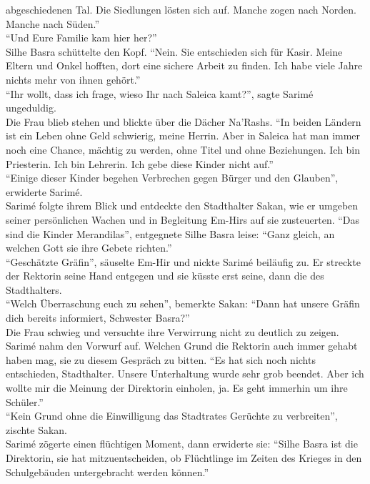 abgeschiedenen Tal. Die Siedlungen lösten sich auf. Manche zogen nach Norden. Manche nach 
Süden.''\\
``Und Eure Familie kam hier her?''\\
Silhe Basra schüttelte den Kopf. ``Nein. Sie entschieden sich für Kasir. Meine Eltern und Onkel 
hofften, dort eine sichere Arbeit zu finden. Ich habe viele Jahre nichts mehr von ihnen gehört.''\\
``Ihr wollt, dass ich frage, wieso Ihr nach Saleica kamt?'', sagte Sarimé ungeduldig.\\
Die Frau blieb stehen und blickte über die Dächer Na'Rashs. ``In beiden Ländern ist ein Leben ohne 
Geld schwierig, meine Herrin. Aber in Saleica hat man immer noch eine Chance, mächtig zu werden, 
ohne Titel und ohne Beziehungen. Ich bin Priesterin. Ich bin Lehrerin. Ich gebe diese Kinder nicht 
auf.''\\
``Einige dieser Kinder begehen Verbrechen gegen Bürger und den Glauben'', erwiderte Sarimé.\\
Sarimé folgte ihrem Blick und entdeckte den Stadthalter Sakan, wie er umgeben seiner persönlichen 
Wachen und in Begleitung Em-Hirs auf sie zusteuerten. ``Das sind die Kinder Merandilas'', 
entgegnete Silhe Basra leise: ``Ganz gleich, an welchen Gott sie ihre Gebete richten.''\\
``Geschätzte Gräfin'', säuselte Em-Hir und nickte Sarimé beiläufig zu. Er streckte der Rektorin 
seine Hand entgegen und sie küsste erst seine, dann die des Stadthalters.\\
``Welch Überraschung euch zu sehen'', bemerkte Sakan: ``Dann hat unsere Gräfin dich bereits 
informiert, Schwester Basra?''\\
Die Frau schwieg und versuchte ihre Verwirrung nicht zu deutlich zu zeigen.\\
Sarimé nahm den Vorwurf auf. Welchen Grund die Rektorin auch immer gehabt haben mag, sie zu diesem 
Gespräch zu bitten. ``Es hat sich noch nichts entschieden, Stadthalter. Unsere Unterhaltung wurde 
sehr grob beendet. Aber ich wollte mir die Meinung der Direktorin einholen, ja. Es geht immerhin um 
ihre Schüler.''\\
``Kein Grund ohne die Einwilligung das Stadtrates Gerüchte zu verbreiten'', zischte Sakan.\\
Sarimé zögerte einen flüchtigen Moment, dann erwiderte sie: ``Silhe Basra ist die Direktorin, sie 
hat mitzuentscheiden, ob Flüchtlinge im Zeiten des Krieges in den Schulgebäuden untergebracht 
werden können.''\\

